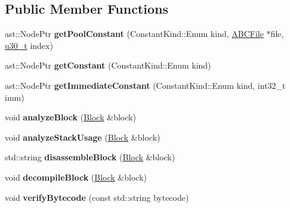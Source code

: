 \subsection*{Public Member Functions}
\begin{DoxyCompactItemize}
\item 
\hypertarget{classjswf_1_1avm2_1_1_verifier_aff482abd981ac06b6c074fe2c3bea77d}{ast\+::\+Node\+Ptr {\bfseries get\+Pool\+Constant} (Constant\+Kind\+::\+Enum kind, \hyperlink{classjswf_1_1avm2_1_1_a_b_c_file}{A\+B\+C\+File} $\ast$file, \hyperlink{namespacejswf_aa10d9ddca2a6a5debdc261dfae3d1117}{u30\+\_\+t} index)}\label{classjswf_1_1avm2_1_1_verifier_aff482abd981ac06b6c074fe2c3bea77d}

\item 
\hypertarget{classjswf_1_1avm2_1_1_verifier_ab61123b628a07640ac30c8148f95eeac}{ast\+::\+Node\+Ptr {\bfseries get\+Constant} (Constant\+Kind\+::\+Enum kind)}\label{classjswf_1_1avm2_1_1_verifier_ab61123b628a07640ac30c8148f95eeac}

\item 
\hypertarget{classjswf_1_1avm2_1_1_verifier_a8dfb2a5589e0a7463c7c5338396b3679}{ast\+::\+Node\+Ptr {\bfseries get\+Immediate\+Constant} (Constant\+Kind\+::\+Enum kind, int32\+\_\+t imm)}\label{classjswf_1_1avm2_1_1_verifier_a8dfb2a5589e0a7463c7c5338396b3679}

\item 
\hypertarget{classjswf_1_1avm2_1_1_verifier_afa371c071bdf448c7f9b9ef967b10785}{void {\bfseries analyze\+Block} (\hyperlink{structjswf_1_1avm2_1_1_block}{Block} \&block)}\label{classjswf_1_1avm2_1_1_verifier_afa371c071bdf448c7f9b9ef967b10785}

\item 
\hypertarget{classjswf_1_1avm2_1_1_verifier_a6ce45eac703bd222fd5724574a51e382}{void {\bfseries analyze\+Stack\+Usage} (\hyperlink{structjswf_1_1avm2_1_1_block}{Block} \&block)}\label{classjswf_1_1avm2_1_1_verifier_a6ce45eac703bd222fd5724574a51e382}

\item 
\hypertarget{classjswf_1_1avm2_1_1_verifier_ad516bbdfedd65364ea1c302552374f17}{std\+::string {\bfseries disassemble\+Block} (\hyperlink{structjswf_1_1avm2_1_1_block}{Block} \&block)}\label{classjswf_1_1avm2_1_1_verifier_ad516bbdfedd65364ea1c302552374f17}

\item 
\hypertarget{classjswf_1_1avm2_1_1_verifier_a60866c2d640fc73de0b50d2730f75b87}{void {\bfseries decompile\+Block} (\hyperlink{structjswf_1_1avm2_1_1_block}{Block} \&block)}\label{classjswf_1_1avm2_1_1_verifier_a60866c2d640fc73de0b50d2730f75b87}

\item 
\hypertarget{classjswf_1_1avm2_1_1_verifier_a60901d418cf1f77c4d5ef6401980999f}{void {\bfseries verify\+Bytecode} (const std\+::string bytecode)}\label{classjswf_1_1avm2_1_1_verifier_a60901d418cf1f77c4d5ef6401980999f}

\end{DoxyCompactItemize}
